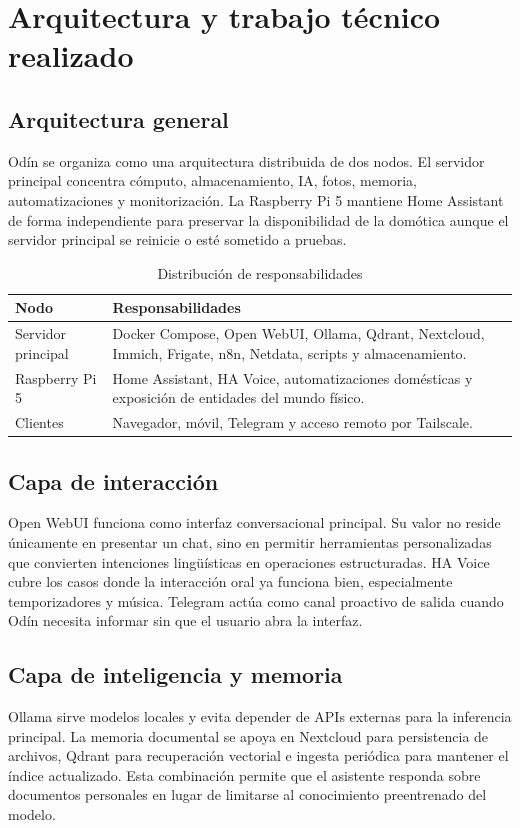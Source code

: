 \chapter{Arquitectura y trabajo técnico realizado}

\section{Arquitectura general}
Odín se organiza como una arquitectura distribuida de dos nodos. El servidor principal concentra cómputo, almacenamiento, IA, fotos, memoria, automatizaciones y monitorización. La Raspberry Pi 5 mantiene Home Assistant de forma independiente para preservar la disponibilidad de la domótica aunque el servidor principal se reinicie o esté sometido a pruebas.

\begin{table}[H]
  \centering
  \caption{Distribución de responsabilidades}
  \label{tab:distribucion-responsabilidades}
  \begin{tabularx}{\textwidth}{lX}
    \toprule
    Nodo & Responsabilidades \\
    \midrule
    Servidor principal & Docker Compose, Open WebUI, Ollama, Qdrant, Nextcloud, Immich, Frigate, n8n, Netdata, scripts y almacenamiento. \\
    Raspberry Pi 5 & Home Assistant, HA Voice, automatizaciones domésticas y exposición de entidades del mundo físico. \\
    Clientes & Navegador, móvil, Telegram y acceso remoto por Tailscale. \\
    \bottomrule
  \end{tabularx}
\end{table}

\section{Capa de interacción}
Open WebUI funciona como interfaz conversacional principal. Su valor no reside únicamente en presentar un chat, sino en permitir herramientas personalizadas que convierten intenciones lingüísticas en operaciones estructuradas. HA Voice cubre los casos donde la interacción oral ya funciona bien, especialmente temporizadores y música. Telegram actúa como canal proactivo de salida cuando Odín necesita informar sin que el usuario abra la interfaz.

\section{Capa de inteligencia y memoria}
Ollama sirve modelos locales y evita depender de APIs externas para la inferencia principal. La memoria documental se apoya en Nextcloud para persistencia de archivos, Qdrant para recuperación vectorial e ingesta periódica para mantener el índice actualizado. Esta combinación permite que el asistente responda sobre documentos personales en lugar de limitarse al conocimiento preentrenado del modelo.

